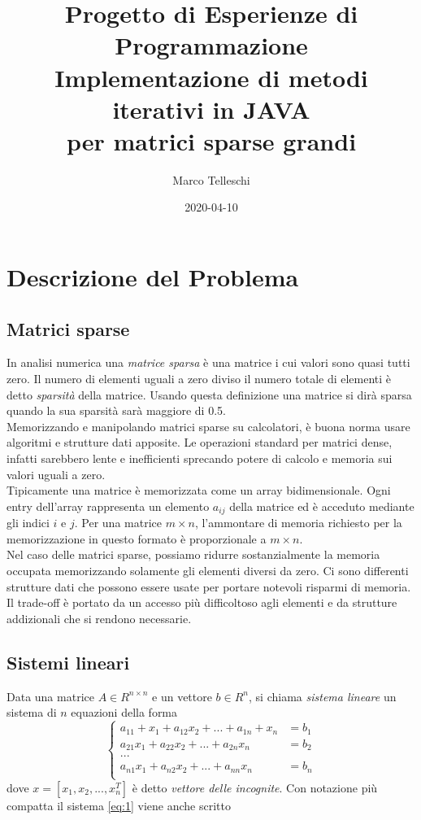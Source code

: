 \documentclass[12pt]{article}
\title{Progetto di Esperienze di Programmazione\\
    \large Implementazione di metodi iterativi in JAVA\\per matrici sparse grandi}
\author{Marco Telleschi}
\date{2020-04-10}
\begin{document}
\maketitle
{}
\newpage
{}

\tableofcontents
\newpage


\section{Descrizione del Problema}
\subsection{Matrici sparse}
In analisi numerica una \textit{matrice sparsa} è una matrice i cui valori sono quasi tutti zero. Il numero di elementi uguali a zero diviso il numero totale di elementi è detto \textit{sparsità} della matrice. Usando questa definizione una matrice si dirà sparsa quando la sua sparsità sarà maggiore di 0.5. \\
Memorizzando e manipolando matrici sparse su calcolatori, è buona norma usare algoritmi e strutture dati apposite. Le operazioni standard per matrici dense, infatti sarebbero lente e inefficienti sprecando potere di calcolo e memoria sui valori uguali a zero.\\
Tipicamente una matrice è memorizzata come un array bidimensionale. Ogni entry dell'array rappresenta un elemento \(a_{ij}\) della matrice ed è acceduto mediante gli indici \(i\) e \(j\). Per una matrice \(m \times n\), l'ammontare di memoria richiesto per la memorizzazione in questo formato è proporzionale a \(m \times n\).\\
Nel caso delle matrici sparse, possiamo ridurre sostanzialmente la memoria occupata memorizzando solamente gli elementi diversi da zero. Ci sono differenti strutture dati che possono essere usate per portare notevoli risparmi di memoria. Il trade-off è portato da un accesso più difficoltoso agli elementi e da strutture addizionali che si rendono necessarie.

\subsection{Sistemi lineari}
Data una matrice \(A \in R^{n \times n}\) e un vettore \(b \in R^n\), si chiama \textit{sistema lineare} un sistema di \(n\) equazioni della forma
\begin{equation}
\label{eq:1}
\begin{cases}
    a_{1 1}+x_1 + a_{1 2}x_2 + ... + a_{1 n}+x_n &= b_1 \\
    a_{2 1}x_1 + a_{2 2}x_2 + ... + a_{2 n}x_n &= b_2 \\
    ... \\
    a_{n 1}x_1 + a_{n 2}x_2 + ... + a_{n n}x_n &= b_n \\
\end{cases}
\end{equation}
dove \(x = [x_1,x_2,...,x_n^T]\) è detto \textit{vettore delle incognite}. Con notazione più compatta il sistema \eqref{eq:1} viene anche scritto
\end{document}
